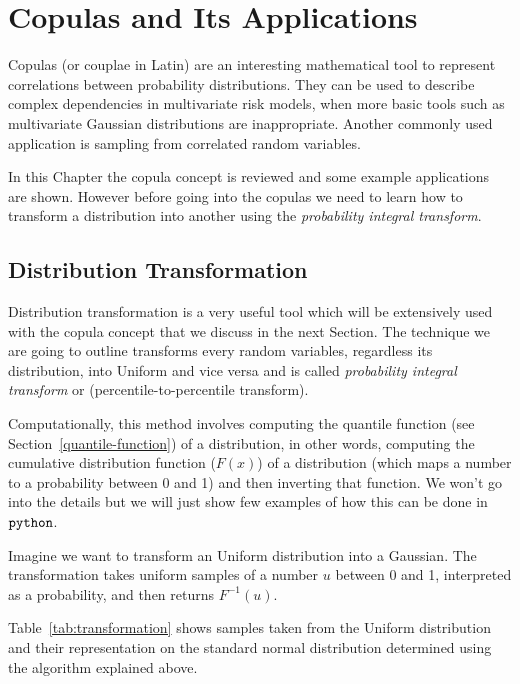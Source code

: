 \chapter{Copulas and Its Applications}

Copulas (or couplae in Latin) are an interesting mathematical tool to represent correlations between probability distributions. They can be used to describe complex dependencies in multivariate risk models, when more basic tools such as multivariate Gaussian distributions are inappropriate. Another commonly used application is sampling from correlated random variables.

In this Chapter the copula concept is reviewed and some example applications are shown. However before going into the copulas we need to learn how to transform a distribution into another using the \emph{probability integral transform}. 


\section{Distribution Transformation}\label{distribution-transformation}

Distribution transformation is a very useful tool which will be
extensively used with the copula concept that we discuss in the next
Section. The technique we are going to outline transforms every random
variables, regardless its distribution, into Uniform and vice versa and is called
\emph{probability integral transform} or (percentile-to-percentile
transform).

Computationally, this method involves computing the quantile function (see Section~\ref{quantile-function}) of
a distribution, in other words, computing the cumulative
distribution function ($F(x)$) of a distribution (which maps a number
to a probability between 0 and 1) and then inverting that
function. We won't go into the details but we will just show few
examples of how this can be done in \(\tt{python}\).

Imagine we want to transform an Uniform distribution into a Gaussian.
The transformation takes uniform samples of a number \(u\) between 0 and
1, interpreted as a probability, and then returns $F^{-1}(u)$. 

Table~\ref{tab:transformation} shows samples taken from the
Uniform distribution and their representation on the standard normal
distribution determined using the algorithm explained above.

